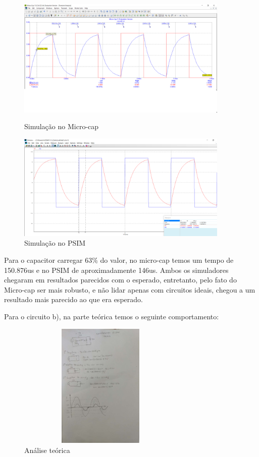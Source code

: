     \begin{figure}[!htb]
    \begin{minipage}{0.5\textwidth}
    \centering
    \includegraphics[width = 0.9\textwidth]{Relatorio1_microcap_Tau.png}
    \caption{Simulação no Micro-cap\cite{microcap}}
    \end{minipage}\hfill
    \begin{minipage}{0.5\textwidth}
    \centering
    \includegraphics[width = 0.9\textwidth]{Relatorio1_PSIM_Tau.png}
    \caption{Simulação no PSIM\cite{psim}}
    \end{minipage}\hfill
\end{figure}

Para o capacitor carregar 63\% do valor, no micro-cap temos um tempo de 150.876us e no PSIM de aproximadamente 146us. Ambos os simuladores chegaram em resultados parecidos com o esperado, entretanto, pelo fato do Micro-cap ser mais robusto, e não lidar apenas com circuitos ideais, chegou a um resultado mais parecido ao que era esperado.
    
\clearpage
    Para o circuito b), na parte teórica temos o seguinte comportamento:
    
 \begin{figure}[!htb]
    \centering
    \includegraphics[width=8cm,height=6cm]{Relatorio1_teo_diodo.png}
    \caption{Análise teórica}
\end{figure}
    
